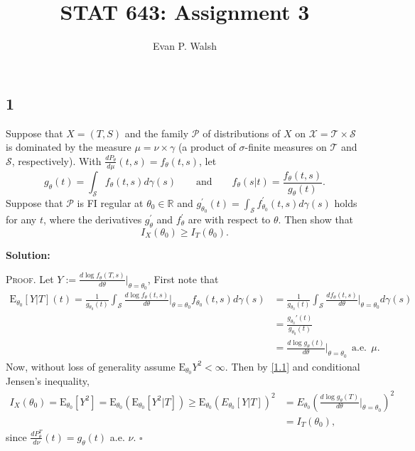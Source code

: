 \documentclass[12pt]{article}
\title{STAT 643: Assignment 3}
\author{Evan P. Walsh}
\newcounter{ProofCounter}
\newenvironment{Proof}{\stepcounter{ProofCounter}\textsc{Proof.}}{\hfill$\square$}
\begin{document}
\maketitle

\newcommand{\E}{\mathrm{E}}
\renewcommand{\baselinestretch}{1}


\subsection*{1}
\begin{tcolorbox}
  Suppose that $X=(T,S)$ and the family $\mathcal{P}$ of distributions of $X$ on $\mathcal{X}=\mathcal{T}\times \mathcal{S}$ is dominated by the measure $\mu=\nu\times \gamma$ (a product of $\sigma$-finite measures on $\mathcal{T}$ and $\mathcal{S}$, respectively).  With $\frac{d P_\theta}{d \mu}(t,s) = f_\theta(t,s)$, let
  \[
    g_\theta(t) = \int_{\mathcal{S}}f_\theta(t,s) d\gamma(s)  \qquad \mbox{and}\qquad f_\theta(s|t) =\frac{f_\theta(t,s)}{g_\theta(t)}.
  \]
  Suppose that $\mathcal{P}$ is FI regular at $\theta_0 \in \mathbb{R}$ and $g^\prime_{\theta_0}(t)=\int_{\mathcal{S}} f^\prime_{\theta_0}(t,s) d \gamma(s)$ holds for any $t$, where the derivatives $g_\theta^\prime$ and $f_\theta^\prime$ are with respect to $\theta$.  Then show that
  \[
    I_X(\theta_0) \geq I_{T}(\theta_0).
  \]
\end{tcolorbox}
\textbf{Solution:}

\begin{Proof}
  Let $Y:= \frac{ d \log f_\theta(T,s) } { d \theta} \big|_{\theta=\theta_0}$,
  First note that 
  \begin{align}
    \E_{\theta_0}[Y|T](t) = \frac{1}{g_{\theta_0}(t)}\int_{\mathcal{S}}\frac{d\log f_{\theta}(t,s)}{d\theta}\bigg|_{\theta=\theta_0}
    f_{\theta_0}(t,s)d\gamma(s)
    & = \frac{1}{g_{\theta_0}(t)}\int_{\mathcal{S}}\frac{df_{\theta}(t,s)}{d\theta}\bigg|_{\theta=\theta_0}d\gamma(s) \nonumber \\
    & = \frac{g_{\theta_0}'(t)}{g_{\theta_0}(t)} \nonumber \\
    & = \frac{d\log g_{\theta}(t)}{d\theta}\bigg|_{\theta = \theta_0} \ \ \text{a.e.}\ \  \mu.
    \label{1.1}
  \end{align}
  Now, without loss of generality assume $\E_{\theta_0}Y^{2} < \infty$. Then by \eqref{1.1} and conditional Jensen's inequality,
  \begin{align*}
    I_{X}(\theta_0) = \E_{\theta_0}[Y^{2}] = \E_{\theta_0}\left( \E_{\theta_0}\left[ Y^2|T \right] \right)
    \geq \E_{\theta_0}\left( E_{\theta_0}[Y|T] \right)^2 & = E_{\theta_0}\left( \frac{d\log g_{\theta}(T)}{d\theta}\bigg|_{\theta=\theta_0} \right)^2  \\
    & = I_{T}(\theta_0),
  \end{align*}
  since $\frac{dP_{\theta}^{T}}{d\nu}(t) = g_{\theta}(t)$ a.e. $\nu$.
\end{Proof}
\end{document}
